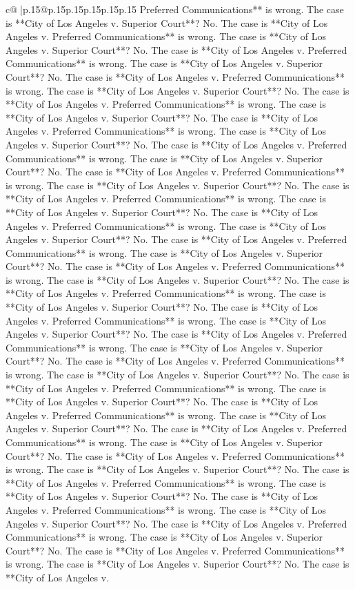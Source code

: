 \documentclass{article}
\begin{document}
{\begin{supertabular}{c@{$\;$}|p{.15\linewidth}@{}p{.15\linewidth}p{.15\linewidth}p{.15\linewidth}p{.15\linewidth}p{.15\linewidth}}
{{{Preferred Communications** is wrong. The case is **City of Los Angeles v. Superior Court**? No. The case is **City of Los Angeles v. Preferred Communications** is wrong. The case is **City of Los Angeles v. Superior Court**? No. The case is **City of Los Angeles v. Preferred Communications** is wrong. The case is **City of Los Angeles v. Superior Court**? No. The case is **City of Los Angeles v. Preferred Communications** is wrong. The case is **City of Los Angeles v. Superior Court**? No. The case is **City of Los Angeles v. Preferred Communications** is wrong. The case is **City of Los Angeles v. Superior Court**? No. The case is **City of Los Angeles v. Preferred Communications** is wrong. The case is **City of Los Angeles v. Superior Court**? No. The case is **City of Los Angeles v. Preferred Communications** is wrong. The case is **City of Los Angeles v. Superior Court**? No. The case is **City of Los Angeles v. Preferred Communications** is wrong. The case is **City of Los Angeles v. Superior Court**? No. The case is **City of Los Angeles v. Preferred Communications** is wrong. The case is **City of Los Angeles v. Superior Court**? No. The case is **City of Los Angeles v. Preferred Communications** is wrong. The case is **City of Los Angeles v. Superior Court**? No. The case is **City of Los Angeles v. Preferred Communications** is wrong. The case is **City of Los Angeles v. Superior Court**? No. The case is **City of Los Angeles v. Preferred Communications** is wrong. The case is **City of Los Angeles v. Superior Court**? No. The case is **City of Los Angeles v. Preferred Communications** is wrong. The case is **City of Los Angeles v. Superior Court**? No. The case is **City of Los Angeles v. Preferred Communications** is wrong. The case is **City of Los Angeles v. Superior Court**? No. The case is **City of Los Angeles v. Preferred Communications** is wrong. The case is **City of Los Angeles v. Superior Court**? No. The case is **City of Los Angeles v. Preferred Communications** is wrong. The case is **City of Los Angeles v. Superior Court**? No. The case is **City of Los Angeles v. Preferred Communications** is wrong. The case is **City of Los Angeles v. Superior Court**? No. The case is **City of Los Angeles v. Preferred Communications** is wrong. The case is **City of Los Angeles v. Superior Court**? No. The case is **City of Los Angeles v. Preferred Communications** is wrong. The case is **City of Los Angeles v. Superior Court**? No. The case is **City of Los Angeles v. Preferred Communications** is wrong. The case is **City of Los Angeles v. Superior Court**? No. The case is **City of Los Angeles v. Preferred Communications** is wrong. The case is **City of Los Angeles v. Superior Court**? No. The case is **City of Los Angeles v. Preferred Communications** is wrong. The case is **City of Los Angeles v. Superior Court**? No. The case is **City of Los Angeles v. Preferred Communications** is wrong. The case is **City of Los Angeles v. Superior Court**? No. The case is **City of Los Angeles v. Preferred Communications** is wrong. The case is **City of Los Angeles v. Superior Court**? No. The case is **City of Los Angeles v. }}}
\end{supertabular}}
\end{document}

